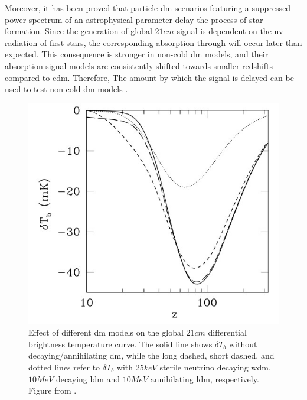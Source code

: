 \documentclass[12pt, TexShade, letterpaper]{report}
\begin{document}
Moreover, it has been proved that particle \gls{dm} scenarios featuring a suppressed power spectrum of an astrophysical parameter delay the process of star formation. Since the generation of global $21cm$ signal is dependent on the \gls{uv} radiation of first stars, the corresponding absorption through will occur later than expected. This consequence is stronger in non-cold \gls{dm} models, and their absorption signal models are consistently shifted towards smaller redshifts compared to \gls{cdm}. Therefore, The amount by which the signal is delayed can be used to test non-cold \gls{dm} models  \cite{noncold_dm_21, first_star_impact, dm_timing}.\par 

\begin{figure}[h!]
    \centering
    \includegraphics{21cm_dm.jpg}
    \caption[Effect of different \gls{dm} models on the global $21cm$ differential brightness temperature curve]{Effect of different \gls{dm} models on the global $21cm$ differential brightness temperature curve. The solid line shows $\delta T_b$ without decaying/annihilating \gls{dm}, while the long dashed, short dashed, and dotted lines refer to $\delta T_b$ with $25keV$ sterile neutrino decaying \gls{wdm}, $10 MeV$ decaying \gls{ldm} and $10MeV$ annihilating \gls{ldm}, respectively. Figure from \cite{constrain_dm_21}.}
    \label{fig:enter-label}
\end{figure}
\end{document}
